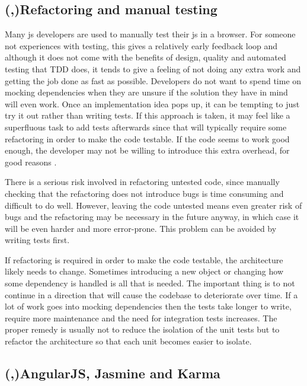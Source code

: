 \documentclass[11pt]{article}
\begin{document}
\subsection{(,)Refactoring and manual testing}

Many \gls{js} developers are used to manually test their \gls{js} in a browser. For someone not experiences with testing, this gives a relatively early feedback loop and although it does not come with the benefits of design, quality and automated testing that TDD does, it tends to give a feeling of not doing any extra work and getting the job done as fast as possible. Developers do not want to spend time on mocking dependencies when they are unsure if the solution they have in mind will even work. Once an implementation idea pops up, it can be tempting to just try it out rather than writing tests. If this approach is taken, it may feel like a superfluous task to add tests afterwards since that will typically require some refactoring in order to make the code testable. If the code seems to work good enough, the developer may not be willing to introduce this extra overhead, for good reasons \cite[question~43]{Stenmark}.

There is a serious risk involved in refactoring untested code\cite[p.~17]{Refactoring}, since manually checking that the refactoring does not introduce bugs is time consuming and difficult to do well. However, leaving the code untested means even greater risk of bugs and the refactoring may be necessary in the future anyway, in which case it will be even harder and more error-prone. This problem can be avoided by writing tests first.

If refactoring is required in order to make the code testable, the architecture likely needs to change. Sometimes introducing a new object or changing how some dependency is handled is all that is needed. The important thing is to not continue in a direction that will cause the codebase to deteriorate over time. \cite[question~34]{Stenmark} If a lot of work goes into mocking dependencies then the tests take longer to write, require more maintenance and the need for integration tests increases. The proper remedy is usually not to reduce the isolation of the unit tests but to refactor the architecture so that each unit becomes easier to isolate. \cite[question~42]{Stenmark}

\subsection{(,)AngularJS, Jasmine and Karma}
\label{subsec:angularjasminekarma}
\end{document}
